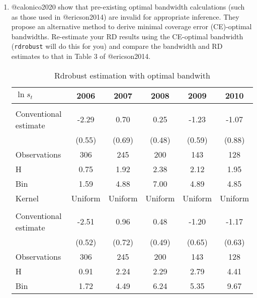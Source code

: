 \documentclass[
  12pt,
]{article}
\begin{document}
\begin{enumerate}
\def\labelenumi{\arabic{enumi}.}
\setcounter{enumi}{6}
\item
  @calonico2020 show that pre-existing optimal bandwidth calculations
  (such as those used in @ericson2014) are invalid for appropriate
  inference. They propose an alternative method to derive minimal
  coverage error (CE)-optimal bandwidths. Re-estimate your RD results
  using the CE-optimal bandwidth (\texttt{rdrobust} will do this for
  you) and compare the bandwidth and RD estimates to that in Table 3 of
  @ericson2014.

  \begin{table}
  \caption{Rdrobust estimation with optimal bandwith}
  \centering
  \begin{tabular}[t]{lccccc}
  \toprule
  $\ln s_t$ & 2006 & 2007 & 2008 & 2009 & 2010\\
  \midrule
  \addlinespace[0.3em]
  \multicolumn{6}{l}{\textit{Panel A. Local linear}}\\
  \hspace{1em}Conventional estimate & -2.29 & 0.70 & 0.25 & -1.23 & -1.07\\
  \hspace{1em} & (0.55) & (0.69) & (0.48) & (0.59) & (0.88)\\
  \hspace{1em}Observations & 306 & 245 & 200 & 143 & \vphantom{3} 128\\
  \hspace{1em}H & 0.75 & 1.92 & 2.38 & 2.12 & 1.95\\
  \hspace{1em}Bin & 1.59 & 4.88 & 7.00 & 4.89 & 4.85\\
  \hspace{1em}Kernel & Uniform & Uniform & Uniform & Uniform & \vphantom{1} Uniform\\
  \\
  \hspace{1em}Conventional estimate & -2.51 & 0.96 & 0.48 & -1.20 & -1.17\\
  \hspace{1em} & (0.52) & (0.72) & (0.49) & (0.65) & (0.63)\\
  \hspace{1em}Observations & 306 & 245 & 200 & 143 & \vphantom{2} 128\\
  \hspace{1em}H & 0.91 & 2.24 & 2.29 & 2.79 & 4.41\\
  \hspace{1em}Bin & 1.72 & 4.49 & 6.24 & 5.35 & 9.67\\

\end{tabular}
\end{table}
\end{enumerate}
\end{document}
